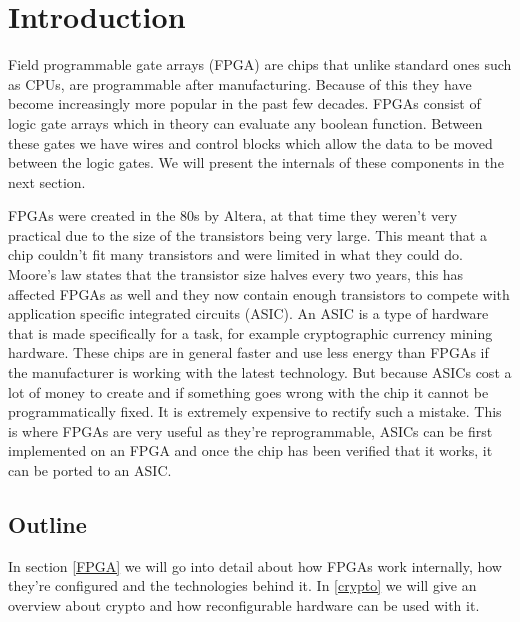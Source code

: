 \chapter{Introduction\label{intro}}

Field programmable gate arrays (FPGA) are chips that unlike standard ones such as
CPUs, are programmable after manufacturing. Because of this they have
become increasingly more popular in the past few decades. FPGAs consist of
logic gate arrays which in theory can evaluate any boolean function. Between
these gates we have wires and control blocks which allow the data to be moved
between the logic gates. We will present the internals of these components in
the next section.

FPGAs were created in the 80s by Altera, at that time they weren't very
practical due to the size of the transistors being very large. This meant that
a chip couldn't fit many transistors and were limited in what they could
do. Moore's law states that the transistor size halves every two years, this
has affected FPGAs as well and they now contain enough transistors to compete
with application specific integrated circuits (ASIC). An ASIC is a type of
hardware that is made specifically for a task, for example cryptographic
currency mining hardware. These chips are in general faster and use less energy
than FPGAs if the manufacturer is working with the latest technology. But
because ASICs cost a lot of money to create and if something goes wrong with
the chip it cannot be programmatically fixed. It is extremely expensive to
rectify such a mistake. This is where FPGAs are very useful as they're
reprogrammable, ASICs can be first implemented on an FPGA and once the chip has
been verified that it works, it can be ported to an ASIC.

\section{Outline\label{outline}}
In section \ref{FPGA} we will go into detail about how FPGAs work
internally, how they're configured and the technologies behind it. In
\ref{crypto} we will give an overview about crypto and how reconfigurable
hardware can be used with it.
